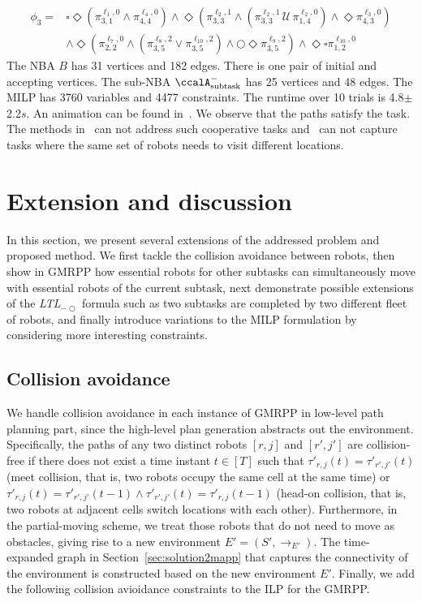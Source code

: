 \documentclass[Afour,sageh,times]{sagej}
\newcommand{\ltl}{ {\it LTL}$_{-\bigcirc}$ }
\newcommand{\auto}[1]{\ccalA_{\textup{#1}}}
\newcommand{\aap}[4]{\mathcal{\pi}_{{#1},{#2}}^{#3,#4}}
\begin{document}
{{\small
\begingroup
\begin{align*}
  \phi_3 = &  \square \Diamond (\pi^{\ell_1,0}_{3,1} \wedge \pi^{\ell_4, 0}_{4,4}) \wedge \Diamond ( \pi^{\ell_2,1}_{3,3} \wedge  (\pi^{\ell_2,1}_{3,3} \,\mathcal{U} \, \pi^{\ell_2,0}_{1,4})  \wedge \Diamond \pi_{4,3}^{\ell_3,0})   \nonumber \\ & \wedge \Diamond (\aap{2}{2}{\ell_7}{0} \wedge (\aap{3}{5}{\ell_8}{2} \vee \aap{3}{5}{\ell_{10}}{2}) \wedge \bigcirc  \Diamond  \aap{3}{5}{\ell_{9}}{2} ) \wedge \Diamond \square \aap{1}{2}{\ell_{10}}{0}
\end{align*}
\endgroup
\normalsize
The NBA $B$ has 31 vertices and 182 edges. There is one pair of initial and accepting vertices. The sub-NBA $\auto{subtask}^-$ has 25 vertices and 48 edges. The MILP has 3760 variables and 4477 constraints. The runtime over 10 trials is 4.8$\pm$2.2$s$. {An animation can be found in~\cite{ltlmrta}.} We observe that the paths satisfy the task. The methods in~\cite{schillinger2018decomposition,schillinger2018simultaneous,faruq2018simultaneous} can not address such cooperative tasks and~\cite{sahin2017provably,sahin2017synchronous,sahin2019multi,sahin2019multirobot} can not capture tasks where the same set of robots needs to visit different locations.


\section{Extension and discussion}\label{sec:extension}
In this section, we present several extensions of the addressed problem and proposed method. We first tackle the collision avoidance between robots, then show in GMRPP  how essential robots for other subtasks  can simultaneously move with essential robots of the current subtask, next demonstrate possible extensions of the \ltl formula such as two subtasks are completed by two different fleet of robots, and finally introduce variations to the MILP formulation by considering more interesting constraints.

\subsection{Collision avoidance}\label{sec:extension_collision}
We handle collision avoidance in each instance of GMRPP in low-level path planning part,  since the high-level plan generation abstracts out the environment. Specifically, the paths of  any two distinct robots $[r,j]$ and $[r', j']$ are collision-free if there does not exist  a time instant $t \in [T]$ such that $\tau'_{r,j}(t) = \tau'_{r',j'}(t)$ (meet collision, that is, two robots occupy the same cell at the same time) or  $\tau'_{r,j}(t) = \tau'_{r',j'}(t-1) \wedge \tau'_{r',j'}(t) = \tau'_{r,j}(t-1)$ (head-on collision, that is, two robots at adjacent cells switch locations with each other). Furthermore, in the partial-moving scheme, we treat those robots that do not need to move  as obstacles, giving rise to a new environment $E'=(S', \to_{E'})$. The time-expanded graph in Section~\ref{sec:solution2mapp} that captures the connectivity of the environment is constructed based on the new environment $E'$. Finally, we add the following collision avioidance constraints to the ILP for the GMRPP.

}}
\end{document}
